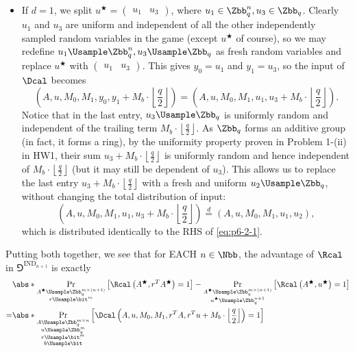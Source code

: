 \begin{answer}[ii]
\begin{itemize}
        \item If $d=1$, we split $u^\bigstar=\left(\begin{array}{c|c}u_1 & u_3\end{array}\right)$, where $u_1\in\Zbb_q^n, u_3\in\Zbb_q$. 
        Clearly $u_1$ and $u_3$ are uniform and independent of all the other independently sampled random variables in the game (except $u^\bigstar$ of course), so we may redefine $u_1\Usample\Zbb_q^n, u_3\Usample \Zbb_q$ as fresh random variables and replace $u^\bigstar$ with $\left(\begin{array}{c|c}u_1 & u_3\end{array}\right)$.
        This gives $y_0=u_1$ and $y_1=u_3$, so the input of $\Dcal$ becomes
        \[
            \left(A, u, M_0, M_1, y_0, y_1 + M_b \cdot \left\lfloor\frac{q}{2}\right\rfloor\right)
            =\left(A, u, M_0, M_1, u_1, u_3 + M_b \cdot \left\lfloor\frac{q}{2}\right\rfloor\right).
        \]
        Notice that in the last entry, $u_3\Usample \Zbb_q$ is uniformly random and independent of the trailing term $M_b \cdot \left\lfloor\frac{q}{2}\right\rfloor$. As $\Zbb_q$ forms an additive group (in fact, it forms a ring), by the uniformity property proven in Problem 1-(ii) in HW1, their sum $u_3 + M_b \cdot \left\lfloor\frac{q}{2}\right\rfloor$ is uniformly random and hence independent of $M_b \cdot \left\lfloor\frac{q}{2}\right\rfloor$ (but it may still be dependent of $u_3$). This allows us to replace the last entry $u_3 + M_b \cdot \left\lfloor\frac{q}{2}\right\rfloor$ with a fresh and uniform $u_2\Usample\Zbb_q$, without changing the total distribution of input:
        \[
            \left(A, u, M_0, M_1, u_1, u_3 + M_b \cdot \left\lfloor\frac{q}{2}\right\rfloor\right)
            \stackrel{d}= \left(A, u, M_0, M_1, u_1, u_2\right),
        \]
        which is distributed identically to  the RHS of \eqref{eq:p6-2-1}.
    \end{itemize}
    Putting both together, we see that for EACH $n\in\Nbb$, the advantage of $\Rcal$ in $\Game^{\textrm{IND}_{n+1}}$ is exactly
    \begin{align*}
        &\abs*{\Pr_{\substack{A^\bigstar\Usample\Zbb_q^{m\times (n+1)}\\r\Usample\bit^m}}\left[\Rcal\left(A^\bigstar, r^TA^\bigstar\right) = 1\right]
        - \Pr_{\substack{A^\bigstar\Usample\Zbb_q^{m\times (n+1)}\\u^\bigstar\Usample\Zbb_q^{n+1}}}\left[\Rcal\left(A^\bigstar, u^\bigstar\right) = 1\right]}\\
        =& \abs*{\Pr_{\substack{A\Usample\Zbb_q^{m\times n}\\u\Usample\Zbb_q^m\\r\Usample\bit^m\\b\Usample\bit}}\left[\Dcal\left(A, u, M_0, M_1, r^TA, r^Tu + M_b \cdot \left\lfloor\frac{q}{2}\right\rfloor\right)=1\right]
}
\end{align*}
\end{answer}
